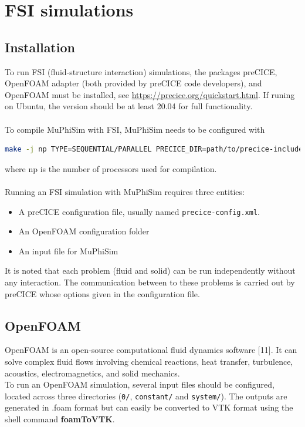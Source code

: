 \documentclass[oneside,11pt,times]{book}
\begin{document}
\chapter{FSI simulations}

\section{Installation}

To run FSI (fluid-structure interaction) simulations, the packages preCICE, OpenFOAM adapter (both provided by preCICE code developers), and OpenFOAM must be installed, see \href{https://precice.org/quickstart.html}{https://precice.org/quickstart.html}. If runing on Ubuntu, the version should be at least 20.04 for full functionality.
\\ \\
To compile MuPhiSim with FSI, MuPhiSim needs to be configured with
\begin{lstlisting}[language=bash]
make -j np TYPE=SEQUENTIAL/PARALLEL PRECICE_DIR=path/to/precice-include
\end{lstlisting}
where np is the number of processors used for compilation.
\\ \\
Running an FSI simulation with MuPhiSim requires three entities:
\begin{itemize}
    \item A preCICE configuration file, usually named \texttt{precice-config.xml}.
    \item An OpenFOAM configuration folder
    \item An input file for MuPhiSim
\end{itemize}
It is noted that each problem (fluid and solid) can be run independently without any interaction. The communication between to these problems is carried out by preCICE whose options given in the configuration file.  

\section{OpenFOAM}
\indent OpenFOAM is an open-source computational fluid dynamics software [11]. It can solve complex fluid flows involving chemical reactions, heat transfer, turbulence, acoustics, electromagnetics, and solid mechanics.\\

To run an OpenFOAM simulation, several input files should be configured, located across three directories (\texttt{0/}, \texttt{constant/} and \texttt{system/}). The outputs are generated in .foam format but can easily be converted to VTK format using the shell command \textbf{foamToVTK}.
\end{document}
